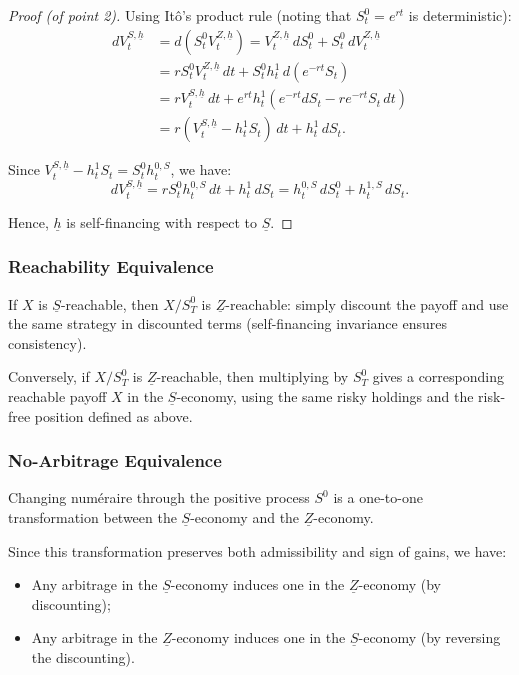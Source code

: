 \documentclass[12pt,a4paper]{article}
\theoremstyle{definition}
\begin{document}
\begin{proof}[Proof (of point 2)]
Using Itô's product rule (noting that $S_t^0 = e^{rt}$ is deterministic):
\[
\begin{aligned}
dV_t^{S,\underline{h}} &= d(S_t^0 V_t^{Z,\underline{h}}) = V_t^{Z,\underline{h}} \, dS_t^0 + S_t^0 \, dV_t^{Z,\underline{h}} \\
&= r S_t^0 V_t^{Z,\underline{h}} \, dt + S_t^0 h_t^1 \, d(e^{-rt} S_t) \\
&= r V_t^{S,\underline{h}} \, dt + e^{rt} h_t^1 (e^{-rt} dS_t - r e^{-rt} S_t \, dt) \\
&= r(V_t^{S,\underline{h}} - h_t^1 S_t) \, dt + h_t^1 \, dS_t.
\end{aligned}
\]

Since $V_t^{S,\underline{h}} - h_t^1 S_t = S_t^0 h_t^{0,S}$, we have:
\[
dV_t^{S,\underline{h}} = r S_t^0 h_t^{0,S} \, dt + h_t^1 \, dS_t = h_t^{0,S} \, dS_t^0 + h_t^{1,S} \, dS_t.
\]

Hence, $\underline{h}$ is self-financing with respect to $\underline{S}$.
\end{proof}

\subsubsection{Reachability Equivalence}

If $X$ is $\underline{S}$-reachable, then $X / S_T^0$ is $\underline{Z}$-reachable:
simply discount the payoff and use the same strategy in discounted terms (self-financing invariance ensures consistency).

Conversely, if $X / S_T^0$ is $\underline{Z}$-reachable, then multiplying by $S_T^0$ gives a corresponding reachable payoff $X$ in the $\underline{S}$-economy, using the same risky holdings and the risk-free position defined as above.

\subsubsection{No-Arbitrage Equivalence}

Changing numéraire through the positive process $S^0$ is a one-to-one transformation between the $\underline{S}$-economy and the $\underline{Z}$-economy.

Since this transformation preserves both admissibility and sign of gains, we have:
\begin{itemize}
\item Any arbitrage in the $\underline{S}$-economy induces one in the $\underline{Z}$-economy (by discounting);
\item Any arbitrage in the $\underline{Z}$-economy induces one in the $\underline{S}$-economy (by reversing the discounting).
\end{itemize}
\end{document}
